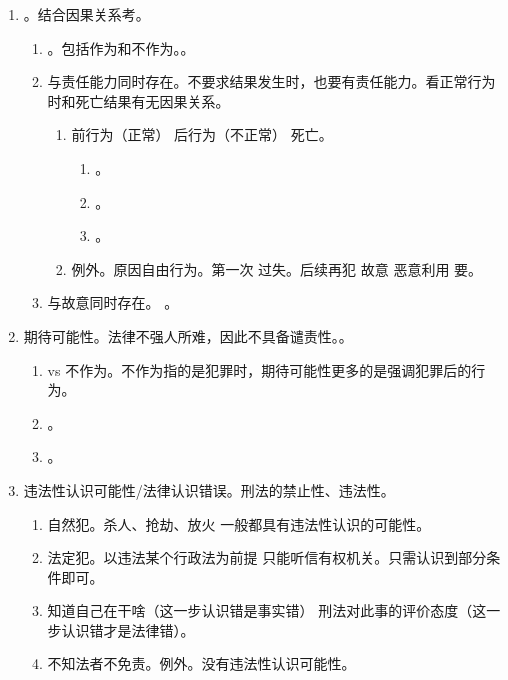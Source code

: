 \begin{enumerate}
\begin{enumerate}
\begin{enumerate}
                \end{enumerate}
        \end{enumerate}
  \item {}。结合因果关系考。
        \begin{enumerate}
          \item {}。包括作为和不作为。。
          \item 与责任能力同时存在。不要求结果发生时，也要有责任能力。看正常行为时和死亡结果有无因果关系。
                \begin{enumerate}
                  \item 前行为（正常） \yjt 后行为（不正常） \yjt 死亡。
                        \begin{enumerate}
                          \item {}。
                          \item {}。
                          \item {}。
                        \end{enumerate}
                  \item 例外。原因自由行为。第一次 \yjt 过失。后续再犯 \yjt 故意 \yjt 恶意利用 \yjt 要。
                \end{enumerate}
          \item 与故意同时存在。
                。
        \end{enumerate}
  \item 期待可能性。法律不强人所难，因此不具备谴责性。。
        \begin{enumerate}
          \item vs 不作为。不作为指的是犯罪时，期待可能性更多的是强调犯罪后的行为。
          \item {}。
          \item {}。
        \end{enumerate}
  \item 违法性认识可能性/法律认识错误。刑法的禁止性、违法性。
        \begin{enumerate}
          \item 自然犯。杀人、抢劫、放火 \yjt 一般都具有违法性认识的可能性。
          \item 法定犯。以违法某个行政法为前提 \yjt 只能听信有权机关。只需认识到部分条件即可。
          \item 知道自己在干啥（这一步认识错是事实错） \yjt 刑法对此事的评价态度（这一步认识错才是法律错）。
          \item 不知法者不免责。例外。没有违法性认识可能性。
        \end{enumerate}
\end{enumerate}
